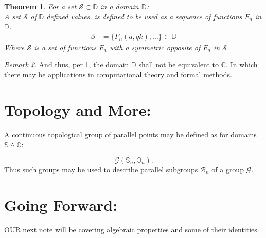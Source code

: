 \documentclass[10pt]{article}
\theoremstyle{plain}
\newtheorem{theorem}{Theorem}[section]
\theoremstyle{definition}
\theoremstyle{remark}
\newtheorem{remark}[theorem]{Remark}
\begin{document}
\begin{theorem}
\label{theo-1}
	For a set $\mathcal{S} \subset \mathbb{D}$ in a domain $\mathbb{D}$:\\
	A set $\mathcal{S}$ of $\mathbb{D}$ defined values, is defined to be used as a sequence of functions $F_n$ in $\mathbb{D}$.
	\begin{align*}
		\mathcal{S} &= \{F_n(a, qk), \dots\} \subset \mathbb{D}
	\end{align*}
	Where $\mathcal{S}$ is a set of functions $F_n$ with a symmetric opposite of $F_n$ in $\mathcal{S}$.
\end{theorem}
\begin{remark}
	And thus, per \ref{theo-1}, the domain $\mathbb{D}$ shall not be equivalent to $\mathbb{C}$. In which there may be applications in computational theory and formal methods.
\end{remark}
\section{Topology and More:}
A continuous topological group of parallel points may be defined as for domains $\mathbb{S} \land \mathbb{O}$:

\begin{equation}
	\mathcal{G}(\mathbb{S}_n, \mathbb{O}_n).
\end{equation}
Thus such groups may be used to describe parallel subgroups $\mathcal{B}_n$ of a group $\mathcal{G}$.

\section{Going Forward:}

\lettrine[lines=1, lhang=0.1, loversize=0.2]{O}UR next note will be covering algebraic properties and some of their identities.

\nocite{*}




\end{document}
